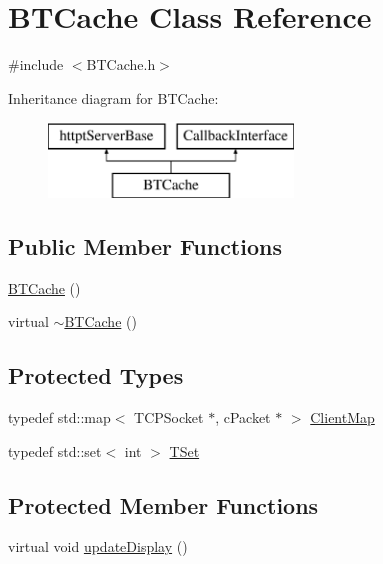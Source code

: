 \hypertarget{classBTCache}{}\section{B\+T\+Cache Class Reference}
\label{classBTCache}


{\ttfamily \#include $<$B\+T\+Cache.\+h$>$}

Inheritance diagram for B\+T\+Cache\+:\begin{figure}[H]
\begin{center}
\leavevmode
\includegraphics[height=2.000000cm]{classBTCache}
\end{center}
\end{figure}
\subsection*{Public Member Functions}
\begin{DoxyCompactItemize}
\item 
\hyperlink{classBTCache_a473a22048f77d193d17086f0d8cb3cc8}{B\+T\+Cache} ()
\item 
virtual \hyperlink{classBTCache_a8770b01f578dcca7a657d58a6d844f73}{$\sim$\+B\+T\+Cache} ()
\end{DoxyCompactItemize}
\subsection*{Protected Types}
\begin{DoxyCompactItemize}
\item 
typedef std\+::map$<$ T\+C\+P\+Socket $\ast$, c\+Packet $\ast$ $>$ \hyperlink{classBTCache_ac80b2a8f5787af11c89dbd05a187029e}{Client\+Map}
\item 
typedef std\+::set$<$ int $>$ \hyperlink{classBTCache_ae334281f1ee5074cc1d6e82b661b60e4}{T\+Set}
\end{DoxyCompactItemize}
\subsection*{Protected Member Functions}
\begin{DoxyCompactItemize}
\item 
virtual void \hyperlink{classBTCache_aab85cef7a8a821c2fca105264b97f6ac}{update\+Display} ()
\end{DoxyCompactItemize}
